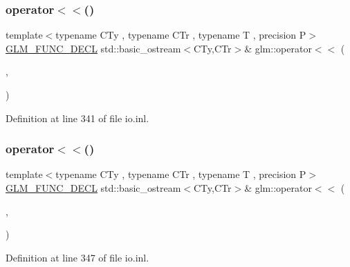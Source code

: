 \subsubsection{\texorpdfstring{operator$<$$<$()}{operator<<()}\hspace{0.1cm}{\footnotesize\ttfamily [10/15]}}
{\footnotesize\ttfamily template$<$typename C\+Ty , typename C\+Tr , typename T , precision P$>$ \\
\mbox{\hyperlink{setup_8hpp_ab2d052de21a70539923e9bcbf6e83a51}{G\+L\+M\+\_\+\+F\+U\+N\+C\+\_\+\+D\+E\+CL}} std\+::basic\+\_\+ostream$<$C\+Ty,C\+Tr$>$\& glm\+::operator$<$$<$ (\begin{DoxyParamCaption}\item[{std\+::basic\+\_\+ostream$<$ C\+Ty, C\+Tr $>$ \&}]{,  }\item[{\mbox{\hyperlink{structglm_1_1tmat3x3}{tmat3x3}}$<$ T, P $>$ const \&}]{ }\end{DoxyParamCaption})}



Definition at line 341 of file io.\+inl.

\mbox{\label{group__gtx__io_ga5a5ca6f99c027a2277b24de487198fe0}} 
\subsubsection{\texorpdfstring{operator$<$$<$()}{operator<<()}\hspace{0.1cm}{\footnotesize\ttfamily [11/15]}}
{\footnotesize\ttfamily template$<$typename C\+Ty , typename C\+Tr , typename T , precision P$>$ \\
\mbox{\hyperlink{setup_8hpp_ab2d052de21a70539923e9bcbf6e83a51}{G\+L\+M\+\_\+\+F\+U\+N\+C\+\_\+\+D\+E\+CL}} std\+::basic\+\_\+ostream$<$C\+Ty,C\+Tr$>$\& glm\+::operator$<$$<$ (\begin{DoxyParamCaption}\item[{std\+::basic\+\_\+ostream$<$ C\+Ty, C\+Tr $>$ \&}]{,  }\item[{\mbox{\hyperlink{structglm_1_1tmat3x4}{tmat3x4}}$<$ T, P $>$ const \&}]{ }\end{DoxyParamCaption})}



Definition at line 347 of file io.\+inl.

\mbox{\label{group__gtx__io_ga8ce3cf61260e62080a9596c2f10ab4a0}} 
